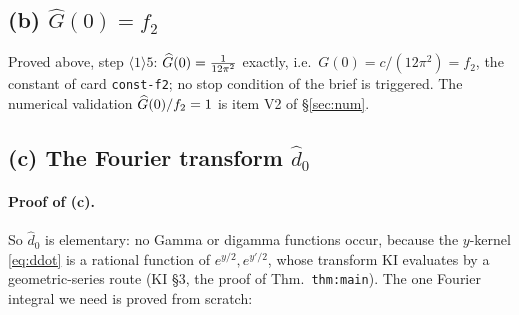\documentclass[11pt]{article}
\theoremstyle{definition}\newtheorem{hypothesis}[theorem]{Hypothesis}
\begin{document}
\subsection{(b) $\widehat G(0)=f_2$}\label{sec:T4b}
Proved above, step $\langle1\rangle5$: $\widehat G(0)=\frac1{12\pi^2}$ exactly, i.e.\ $G(0)=c/(12\pi^2)=f_2$, the
constant of card \texttt{const-f2}; no stop condition of the brief is triggered.  The numerical
validation $\widehat G(0)/f_2=1$ is item V2 of \S\ref{sec:num}.
\subsection{(c) The Fourier transform $\hat d_0$}\label{sec:T4c}
\paragraph{Proof of (c).}

So $\hat d_0$ is elementary: no Gamma or digamma functions occur, because the $y$-kernel \eqref{eq:ddot}
is a rational function of $e^{y/2},e^{y'/2}$, whose transform KI evaluates by a geometric-series route
(KI \S3, the proof of Thm.~\texttt{thm:main}).
The one Fourier integral we need is proved from scratch:
\end{document}
